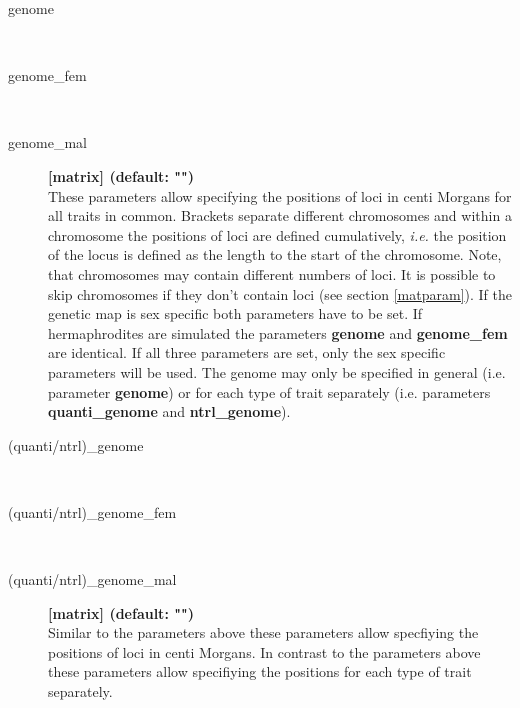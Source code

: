 \documentclass[letterpaper,12pt,oneside]{book}
\begin{document}
\begin{description}
\item[genome]\hspace*{\fill}\\
\vspace{-9mm}
\item[genome\_fem]\hspace*{\fill}\\
\vspace{-9mm}
\item[genome\_mal]\textbf{[matrix] (default: "")}\\
These parameters allow specifying the positions of loci in centi Morgans for all traits in common.
Brackets separate different chromosomes and within a chromosome the positions of  loci are defined  cumulatively, \textit{i.e.} the position of the locus is defined as the length to the start of the chromosome. Note, that
chromosomes may contain different numbers of loci. It is possible to skip chromosomes if they don't
contain loci (see section \ref{matparam}). If the genetic map is sex specific both parameters have
to be set. If hermaphrodites are simulated the parameters \textbf{genome} and \textbf{genome\_fem} are identical.
If all three parameters are set, only the sex specific parameters will be used. The genome may only
be specified in general (i.e. parameter \textbf{genome}) or for each type of trait separately (i.e.
parameters \textbf{quanti\_genome} and \textbf{ntrl\_genome}).\\


\item[(quanti/ntrl)\_genome]\hspace*{\fill}\\
\vspace{-9mm}
\item[(quanti/ntrl)\_genome\_fem]\hspace*{\fill}\\
\vspace{-9mm}
\item[(quanti/ntrl)\_genome\_mal]\textbf{[matrix] (default: "")}\\
Similar to the parameters above these parameters allow specfiying the positions of loci in centi
Morgans. In contrast to the parameters above these parameters allow specifiying the positions for
each type of trait separately.\\


\end{description}
\end{document}
